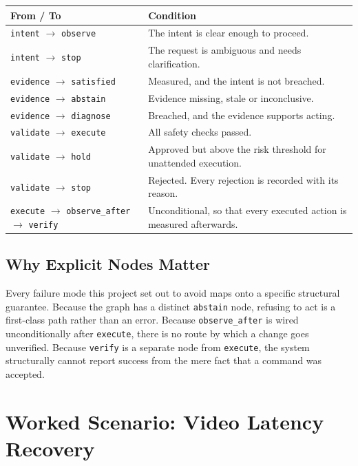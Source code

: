 \documentclass[12pt,a4paper]{report}
\begin{document}
\begin{center}
\begin{tabular}{@{}L{3.2cm}L{9.8cm}@{}}
\toprule
\textbf{From / To} & \textbf{Condition} \\
\midrule
\texttt{intent} $\to$ \texttt{observe}
  & The intent is clear enough to proceed. \\
\texttt{intent} $\to$ \texttt{stop}
  & The request is ambiguous and needs clarification. \\
\texttt{evidence} $\to$ \texttt{satisfied}
  & Measured, and the intent is not breached. \\
\texttt{evidence} $\to$ \texttt{abstain}
  & Evidence missing, stale or inconclusive. \\
\texttt{evidence} $\to$ \texttt{diagnose}
  & Breached, and the evidence supports acting. \\
\texttt{validate} $\to$ \texttt{execute}
  & All safety checks passed. \\
\texttt{validate} $\to$ \texttt{hold}
  & Approved but above the risk threshold for unattended execution. \\
\texttt{validate} $\to$ \texttt{stop}
  & Rejected. Every rejection is recorded with its reason. \\
\texttt{execute} $\to$ \texttt{observe\_after} $\to$ \texttt{verify}
  & Unconditional, so that every executed action is measured afterwards. \\
\bottomrule
\end{tabular}
\end{center}

\subsection{Why Explicit Nodes Matter}

Every failure mode this project set out to avoid maps onto a specific structural
guarantee. Because the graph has a distinct \texttt{abstain} node, refusing to
act is a first-class path rather than an error. Because
\texttt{observe\_after} is wired unconditionally after \texttt{execute}, there
is no route by which a change goes unverified. Because \texttt{verify} is a
separate node from \texttt{execute}, the system structurally cannot report
success from the mere fact that a command was accepted.

\section{Worked Scenario: Video Latency Recovery}
\end{document}
